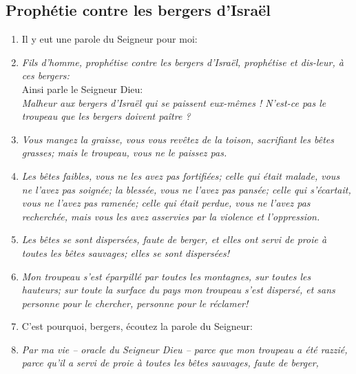 \subsection*{Prophétie contre les bergers d'Israël}
\begin{enumerate}[leftmargin=\psleftmargin, labelsep = \pslabelsep, label={\arabic*}, font=\color{\pscolor}\small\textsuperscript, parsep=0em, itemsep=0em, topsep=0em ]
  \item {}Il y eut une parole du Seigneur pour moi:
  \item {}\textit{Fils d’homme, prophétise contre les bergers d’Israël, \brk
          prophétise et dis-leur, à ces bergers:} \\
        Ainsi parle le Seigneur Dieu: \\
        \textit{Malheur aux bergers d’Israël qui se paissent eux-mêmes ! \brk
          N’est-ce pas le troupeau que les bergers doivent paître ?}
  \item {}\textit{Vous mangez la graisse, \brk
          vous vous revêtez de la toison, \brk
          sacrifiant les bêtes grasses; \brk
          mais le troupeau, vous ne le paissez pas.}
  \item {}\textit{Les bêtes faibles, vous ne les avez pas fortifiées;\brk
          celle qui était malade, vous ne l'avez pas soignée; \brk
          la blessée, vous ne l'avez pas pansée; \brk
          celle qui s’écartait, vous ne l’avez pas ramenée;\brk
          celle qui était perdue, vous ne l’avez pas recherchée, \brk
          mais vous les avez asservies par la violence et l’oppression.}
  \item {}\textit{Les bêtes se sont dispersées, faute de berger, \brk
          et elles ont servi de proie à toutes les bêtes sauvages; \brk
          elles se sont dispersées!}
  \item {}\textit{Mon troupeau s’est éparpillé par toutes les montagnes, sur toutes les hauteurs; \brk
          sur toute la surface du pays mon troupeau s’est dispersé, \brk
          et sans personne pour le chercher, personne pour le réclamer!} \verseSpace
  \item {}C’est pourquoi, bergers, écoutez la parole du Seigneur:
  \item {}\textit{Par ma vie – oracle du Seigneur Dieu – \brk
          parce que mon troupeau a été razzié, \brk
          parce qu’il a servi de proie à toutes les bêtes sauvages, faute de berger, \brk
}
\end{enumerate}
